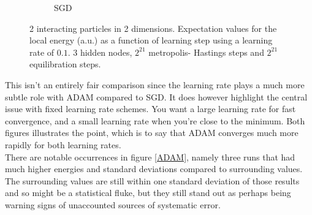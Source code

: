 \documentclass[11pt,a4paper,titlepage]{article}
\begin{document}
\begin{figure}[H]
\begin{subfigure}[t]{.5\textwidth}
\caption{SGD}
\label{SGD2}
\end{subfigure}
\caption[SGD v. ADAM high learning rate]{2 interacting particles in 2 dimensions. Expectation values for the local energy (a.u.) as a function of learning step using a learning rate of $0.1$. 3 hidden nodes, $2^{21}$ metropolis- Hastings steps and $2^{21}$ equilibration steps. }
\label{fig:ADAM_v_SGD2}
\end{figure}

This isn't an entirely fair comparison since the learning rate plays a much more subtle role with ADAM compared to SGD. It does however highlight the central issue with fixed learning rate schemes. You want a large learning rate for fast convergence, and a small learning rate when you're close to the minimum. Both figures illustrates the point, which is to say that ADAM converges much more rapidly for both learning rates.\\ There are notable occurrences in figure \ref{ADAM}, namely three runs that had much higher energies and standard deviations compared to surrounding values. The surrounding values are still within one standard deviation of those results and so might be a statistical fluke, but they still stand out as perhaps being warning signs of unaccounted sources of systematic error.
\end{document}
